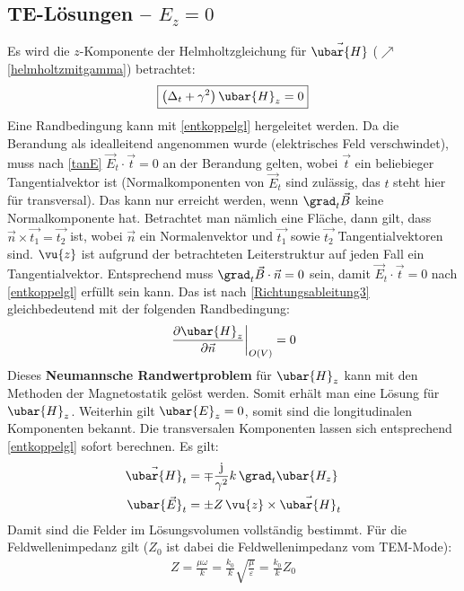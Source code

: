 \subsection{TE-Lösungen -- $E_z=0$}
Es wird die \(z\)-Komponente der Helmholtzgleichung für \(\vec{\ubar{H}}\) ($\nearrow$\ref{helmholtzmitgamma}) betrachtet:
	\begin{equation}
		\boxed{\left(\Delta _t + \gamma^2\right) \ubar{H}_z =  0} 
	\end{equation}
	Eine Randbedingung kann mit \ref{entkoppelgl} hergeleitet werden. Da die Berandung als idealleitend angenommen wurde (elektrisches Feld verschwindet), muss nach \ref{tanE} $\vec{E}_t\cdot\vec{t}=0$ an der Berandung gelten, wobei $\vec{t}$ ein beliebieger Tangentialvektor ist (Normalkomponenten von $\vec{E}_t$ sind zulässig, das $t$ steht hier für transversal). Das kann nur erreicht werden, wenn $\grad_t \vec{B}$ keine Normalkomponente hat. Betrachtet man nämlich eine Fläche, dann gilt, dass $\vec{n}\times\vec{t_1}=\vec{t_2}$ ist, wobei $\vec{n}$ ein Normalenvektor und $\vec{t_1}$ sowie $\vec{t_2}$ Tangentialvektoren sind. $\vu{z}$ ist aufgrund der betrachteten Leiterstruktur auf jeden Fall ein Tangentialvektor. Entsprechend muss $\grad_t \vec{B}\cdot \vec{n}=0$ sein, damit $\vec{E}_t\cdot\vec{t}=0$ nach \ref{entkoppelgl} erfüllt sein kann. Das ist nach \ref{Richtungsableitung3} gleichbedeutend mit der folgenden Randbedingung:
	\begin{equation}
		\left. \frac{\partial \ubar{H}_z}{\partial \vec{n}}\right|_{O(V)} = 0
	\end{equation}
	 Dieses \textbf{Neumannsche Randwertproblem} für $\ubar{H}_z$ kann mit den Methoden der Magnetostatik  gelöst werden. Somit erhält man eine Lösung für $\ubar{H}_z$. Weiterhin gilt \(\ubar{E}_z = 0\), somit sind die longitudinalen Komponenten bekannt. Die transversalen Komponenten lassen sich entsprechend \ref{entkoppelgl} sofort berechnen. Es gilt:
	\begin{equation}\begin{split}
		\vec{\ubar{H}}_t &= \mp \frac{\mathrm{j}}{\gamma^2}  k\, \grad _t \ubar{{H_z}}\\ 
			\ubar{\vec{E}}_t &= \pm Z\, \vu{z}\times \vec{\ubar{H}}_{t} 
		\end{split}\end{equation}		
	Damit sind die Felder im Lösungsvolumen vollständig bestimmt. Für die Feldwellenimpedanz gilt ($Z_0$ ist dabei die Feldwellenimpedanz vom TEM-Mode):	
	\begin{equation}\begin{split}	
			 \boxed{Z=\frac{\mu\omega}{ k} = \frac{ k_0}{ k}\sqrt{\frac{\mu}{\varepsilon}} = \frac{ k_0}{ k} Z_0}
	\end{split}\end{equation}
